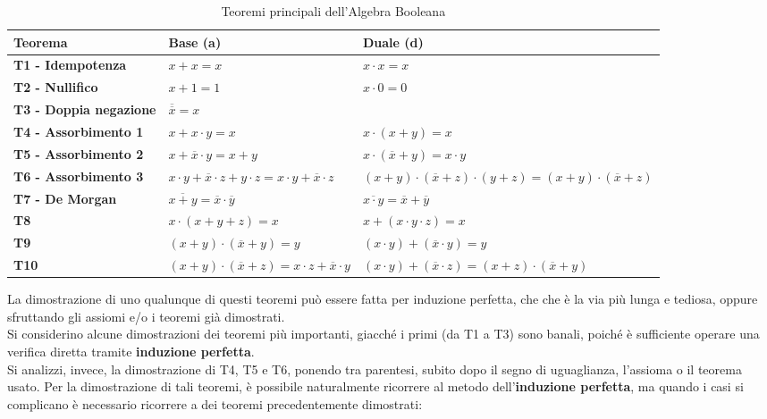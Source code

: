 \documentclass[a4paper]{extarticle}
\begin{document}
\begin{table}[H]
    \centering
    \begin{tabularx}{\textwidth}{l|P|P}
        Teorema & \textbf{Base (a)} & \textbf{Duale (d)} \\
        \hline
        \textbf{T1 - Idempotenza} & \(x + x = x\) & \(x \cdot x = x\)\\
        \textbf{T2 - Nullifico} &\(x + 1 = 1\) & \(x \cdot 0 = 0\)\\
        \textbf{T3 - Doppia negazione} & \(\overline{\overline{x}} = x\) & $ $\\
        \textbf{T4 - Assorbimento 1} & \(x + x \cdot y = x\) & \(x \cdot (x + y) = x\)\\
        \textbf{T5 - Assorbimento 2} & \(x + \overline{x} \cdot y = x + y\) & \(x \cdot (\overline{x} + y) = x \cdot y\)\\
        \textbf{T6 - Assorbimento 3} & \(x \cdot y + \overline{x} \cdot z + y \cdot z = x \cdot y + \overline{x} \cdot z\) & \((x + y) \cdot (\overline{x} + z) \cdot (y + z) = (x + y) \cdot (\overline{x} + z)\)\\
        \textbf{T7 - De Morgan} & \(\overline{x + y} = \overline{x} \cdot \overline{y}\) & \(\overline{x \cdot y} = \overline{x} + \overline{y}\)\\
        \textbf{T8} & \(x \cdot ( x + y + z) = x\) & \(x + (x \cdot y \cdot z) = x\)\\
        \textbf{T9} & \((x + y) \cdot (\overline{x} + y) = y\) & \((x \cdot y) + (\overline{x} \cdot y) = y\)\\
        \textbf{T10} & \((x + y) \cdot (\overline{x} + z) = x \cdot z + \overline{x} \cdot y\) & \((x \cdot y) + (\overline{x} \cdot z) = (x + z) \cdot (\overline{x} + y)\)\\
    \end{tabularx}
    \caption{Teoremi principali dell'Algebra Booleana}
    \label{tab:teoremi_principali}
\end{table}

\vspace{1em}
\noindent
La dimostrazione di uno qualunque di questi teoremi può essere fatta per induzione perfetta, che che è la via più lunga e tediosa, oppure sfruttando gli assiomi e/o i teoremi già dimostrati.\\ Si considerino alcune dimostrazioni dei teoremi più importanti, giacché i primi (da T1 a T3) sono banali, poiché è sufficiente operare una verifica diretta tramite \textbf{induzione perfetta}.\\
Si analizzi, invece, la dimostrazione di T4, T5 e T6, ponendo tra parentesi, subito dopo il segno di uguaglianza, l’assioma o il teorema usato. Per la dimostrazione di tali teoremi, è possibile naturalmente ricorrere al metodo dell'\textbf{induzione perfetta}, ma quando i casi si complicano è necessario ricorrere a dei teoremi precedentemente dimostrati:\\
\end{document}

